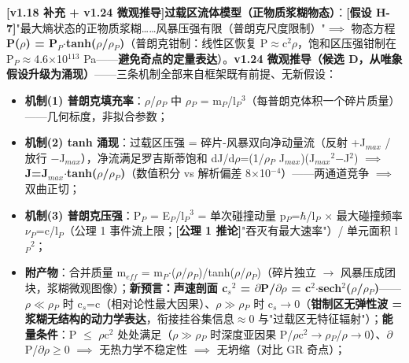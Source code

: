 \documentclass[UTF8,fontset=windows]{csoarticle}
\newcommand{\mtag}[1]{\textbf{[#1]}}
\newcommand{\up}[1]{\ensuremath{^{#1}}}
\newcommand{\down}[1]{\ensuremath{_{#1}}}
\begin{document}
\textbf{\mtag{v1.18 补充 + v1.24 微观推导}过载区流体模型（正物质浆糊物态）}：\mtag{假设 H-7}"最大熵状态的正物质浆糊\ldots{}\ldots{}风暴压强有限（普朗克尺度限制）"\ensuremath{\implies} 物态方程 \textbf{P(\ensuremath{\rho}) = P\down{P}\ensuremath{\cdot}tanh(\ensuremath{\rho}/\ensuremath{\rho}\down{P})}（普朗克钳制：线性区恢复 P\ensuremath{\approx}c\up{2}\ensuremath{\rho}，饱和区压强钳制在 P\down{P}\ensuremath{\approx}4.6\ensuremath{\times}10\up{113} Pa------\textbf{避免奇点的定量表达}）。\textbf{v1.24 微观推导（候选 D，从唯象假设升级为涌现）}------三条机制全部来自框架既有前提、无新假设：
\begin{itemize}
\item \textbf{机制(1) 普朗克填充率}：\ensuremath{\rho}/\ensuremath{\rho}\down{P} 中 \ensuremath{\rho}\down{P} = m\down{P}/l\down{P}\up{3}（每普朗克体积一个碎片质量）------几何标度，非拟合参数；
\item \textbf{机制(2) tanh 涌现}：过载区压强 = 碎片-风暴双向净动量流（反射 +J\down{max} / 放行 \ensuremath{-}J\down{max}），净流满足罗吉斯蒂饱和 dJ/d\ensuremath{\rho}=(1/\ensuremath{\rho}\down{P} J\down{max})(J\down{max}\up{2}\ensuremath{-}J\up{2}) \ensuremath{\implies} \textbf{J=J\down{max}\ensuremath{\cdot}tanh(\ensuremath{\rho}/\ensuremath{\rho}\down{P})}（数值积分 vs 解析偏差 8\ensuremath{\times}10\up{-4}）------两通道竞争 \ensuremath{\implies} 双曲正切；
\item \textbf{机制(3) 普朗克压强}：P\down{P} = E\down{P}/l\down{P}\up{3} = 单次碰撞动量 p\down{P}=\ensuremath{\hbar}/l\down{P} \ensuremath{\times} 最大碰撞频率 \ensuremath{\nu}\down{P}=c/l\down{P}（公理 1 事件流上限；\mtag{公理 1 推论}"吞灭有最大速率"）/ 单元面积 l\down{P}\up{2}；
\item \textbf{附产物}：合并质量 m\down{eff} = m\down{P}\ensuremath{\cdot}(\ensuremath{\rho}/\ensuremath{\rho}\down{P})/tanh(\ensuremath{\rho}/\ensuremath{\rho}\down{P})（碎片独立 \ensuremath{\to} 风暴压成团块，浆糊微观图像）；\textbf{新预言：声速剖面 c\down{s}\up{2} = \ensuremath{\partial}P/\ensuremath{\partial}\ensuremath{\rho} = c\up{2}\ensuremath{\cdot}sech\up{2}(\ensuremath{\rho}/\ensuremath{\rho}\down{P})}------\ensuremath{\rho}\ensuremath{\ll}\ensuremath{\rho}\down{P} 时 c\down{s}=c（相对论性最大因果）、\ensuremath{\rho}\ensuremath{\gg}\ensuremath{\rho}\down{P} 时 c\down{s}\ensuremath{\to}0（\textbf{钳制区无弹性波 = 浆糊无结构的动力学表达}，衔接挂谷集信息\ensuremath{\approx}0 与"过载区无特征辐射"）；\textbf{能量条件}：P \ensuremath{\leq} \ensuremath{\rho}c\up{2} 处处满足（\ensuremath{\rho}\ensuremath{\gg}\ensuremath{\rho}\down{P} 时深度亚因果 P/\ensuremath{\rho}c\up{2}\ensuremath{\to}\ensuremath{\rho}\down{P}/\ensuremath{\rho}\ensuremath{\to}0）、\ensuremath{\partial}P/\ensuremath{\partial}\ensuremath{\rho}\ensuremath{\geq}0 \ensuremath{\implies} 无热力学不稳定性 \ensuremath{\implies} 无坍缩（对比 GR 奇点）；
\end{itemize}
\end{document}
